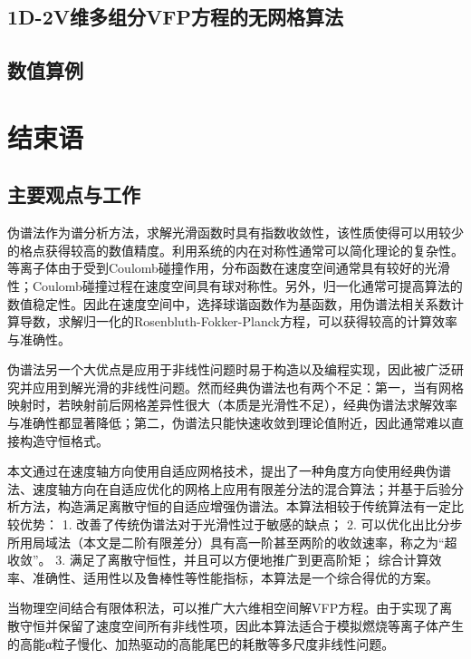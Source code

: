 \section{1D-2V维多组分VFP方程的无网格算法}
\label{1D-2V维多组分VFP方程的无网格算法}

  

\section{数值算例}


\chapter{结束语}

\section{主要观点与工作}

伪谱法作为谱分析方法，求解光滑函数时具有指数收敛性，该性质使得可以用较少的格点获得较高的数值精度。利用系统的内在对称性通常可以简化理论的复杂性。等离子体由于受到Coulomb碰撞作用，分布函数在速度空间通常具有较好的光滑性；Coulomb碰撞过程在速度空间具有球对称性。另外，归一化通常可提高算法的数值稳定性。因此在速度空间中，选择球谐函数作为基函数，用伪谱法相关系数计算导数，求解归一化的Rosenbluth-Fokker-Planck方程，可以获得较高的计算效率与准确性。

伪谱法另一个大优点是应用于非线性问题时易于构造以及编程实现，因此被广泛研究并应用到解光滑的非线性问题。然而经典伪谱法也有两个不足：第一，当有网格映射时，若映射前后网格差异性很大（本质是光滑性不足），经典伪谱法求解效率与准确性都显著降低；第二，伪谱法只能快速收敛到理论值附近，因此通常难以直接构造守恒格式。

本文通过在速度轴方向使用自适应网格技术，提出了一种角度方向使用经典伪谱法、速度轴方向在自适应优化的网格上应用有限差分法的混合算法；并基于后验分析方法，构造满足离散守恒的自适应增强伪谱法。本算法相较于传统算法有一定比较优势：
1.	改善了传统伪谱法对于光滑性过于敏感的缺点；
2.	可以优化出比分步所用局域法（本文是二阶有限差分）具有高一阶甚至两阶的收敛速率，称之为“超收敛”。
3.	满足了离散守恒性，并且可以方便地推广到更高阶矩；
综合计算效率、准确性、适用性以及鲁棒性等性能指标，本算法是一个综合得优的方案。

当物理空间结合有限体积法，可以推广大六维相空间解VFP方程。由于实现了离散守恒并保留了速度空间所有非线性项，因此本算法适合于模拟燃烧等离子体产生的高能α粒子慢化、加热驱动的高能尾巴的耗散等多尺度非线性问题。


